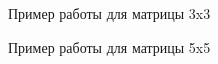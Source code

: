 \documentclass[a4paper,12pt]{report}
\begin{document}
\begin{figure}[ht!]
\caption{Пример работы для матрицы 3x3}
\end{figure}

\begin{figure}[ht!]
\caption{Пример работы для матрицы 5x5}
\end{figure}
\end{document}
